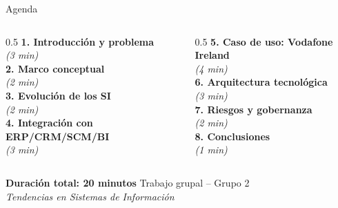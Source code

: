 \documentclass[10pt,aspectratio=169]{beamer}
\begin{document}
\begin{frame}{Agenda}
    \begin{columns}[T]
        \begin{column}{0.5\textwidth}
            \textbf{\textcolor{azulPrincipal}{1. Introducción y problema}}\\
            \textit{(3 min)}\\[0.4cm]
            \textbf{\textcolor{azulPrincipal}{2. Marco conceptual}}\\
            \textit{(2 min)}\\[0.4cm]
            \textbf{\textcolor{azulPrincipal}{3. Evolución de los SI}}\\
            \textit{(2 min)}\\[0.4cm]
            \textbf{\textcolor{azulPrincipal}{4. Integración con ERP/CRM/SCM/BI}}\\
            \textit{(3 min)}
        \end{column}
        \begin{column}{0.5\textwidth}
            \textbf{\textcolor{azulPrincipal}{5. Caso de uso: Vodafone Ireland}}\\
            \textit{(4 min)}\\[0.4cm]
            \textbf{\textcolor{azulPrincipal}{6. Arquitectura tecnológica}}\\
            \textit{(3 min)}\\[0.4cm]
            \textbf{\textcolor{azulPrincipal}{7. Riesgos y gobernanza}}\\
            \textit{(2 min)}\\[0.4cm]
            \textbf{\textcolor{azulPrincipal}{8. Conclusiones}}\\
            \textit{(1 min)}
        \end{column}
    \end{columns}
    \vspace{0.5cm}
    \begin{block}{\textbf{Duración total: 20 minutos}}
        \centering Trabajo grupal -- Grupo 2\\
        \textit{Tendencias en Sistemas de Información}
    \end{block}
\end{frame}

\end{document}
